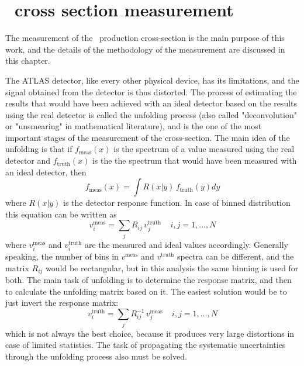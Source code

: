 \chapter{\Zee\ cross section measurement}
\label{sec:ZeeCrossSec}

The measurement of the \Zee\ production cross-section is the main purpose of this work, and the details of the methodology of the measurement are discussed in this chapter.

The ATLAS detector, like every other physical device, has its limitations, and the signal obtained from the detector is thus distorted. The process of estimating the results that would have been achieved with an ideal detector based on the results using the real detector is called the unfolding process (also called "deconvolution" or "unsmearing" in mathematical literature), and is the one of the most important stages of the measurement of the cross-section. The main idea of the unfolding is that if $f_\mathrm{meas}(x)$ is the spectrum of a value measured using the real detector and $f_\mathrm{truth}(x)$ is the the spectrum that would have been measured with an ideal detector, then
\begin{equation}
f_\mathrm{meas}(x) = \int R(x|y) \, f_\mathrm{truth}(y)dy
\end{equation}
where $R(x|y)$ is the detector response function. In case of binned distribution this equation can be written as
\begin{equation}
v^\mathrm{meas}_i = \sum_j R_{ij} \, v^\mathrm{truth}_j \:\:\:\:\: i,j = 1, ... ,N
\end{equation}
where $v^\mathrm{meas}_i$ and $v^\mathrm{truth}_i$ are the measured and ideal values accordingly. Generally speaking, the number of bins in $v^\mathrm{meas}$ and $v^\mathrm{truth}$ spectra can be different, and the matrix $R_{ij}$ would be rectangular, but in this analysis the same binning is used for both. The main task of unfolding is to determine the response matrix, and then to calculate the unfolding matrix based on it. The easiest solution would be to just invert the response matrix:
\begin{equation}
v^\mathrm{truth}_i = \sum_j R^{-1}_{ij} \, v^\mathrm{meas}_j \:\:\:\:\: i,j = 1, ... ,N
\end{equation}
which is not always the best choice, because it produces very large distortions in case of limited statistics. The task of propagating the systematic uncertainties through the unfolding process also must be solved.

